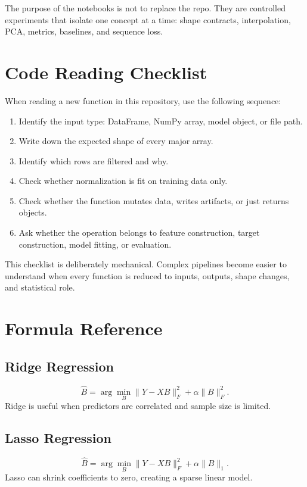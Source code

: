 \documentclass[11pt]{article}
\begin{document}
The purpose of the notebooks is not to replace the repo. They are controlled
experiments that isolate one concept at a time: shape contracts, interpolation,
PCA, metrics, baselines, and sequence loss.

\section{Code Reading Checklist}

When reading a new function in this repository, use the following sequence:
\begin{enumerate}[leftmargin=*]
  \item Identify the input type: DataFrame, NumPy array, model object, or file
  path.
  \item Write down the expected shape of every major array.
  \item Identify which rows are filtered and why.
  \item Check whether normalization is fit on training data only.
  \item Check whether the function mutates data, writes artifacts, or just
  returns objects.
  \item Ask whether the operation belongs to feature construction, target
  construction, model fitting, or evaluation.
\end{enumerate}

This checklist is deliberately mechanical. Complex pipelines become easier to
understand when every function is reduced to inputs, outputs, shape changes,
and statistical role.

\appendix

\section{Formula Reference}

\subsection{Ridge Regression}
\[
  \hat{B}
  =
  \arg\min_B
  \|Y-XB\|_F^2+\alpha\|B\|_F^2.
\]
Ridge is useful when predictors are correlated and sample size is limited.

\subsection{Lasso Regression}
\[
  \hat{B}
  =
  \arg\min_B
  \|Y-XB\|_F^2+\alpha\|B\|_1.
\]
Lasso can shrink coefficients to zero, creating a sparse linear model.
\end{document}
